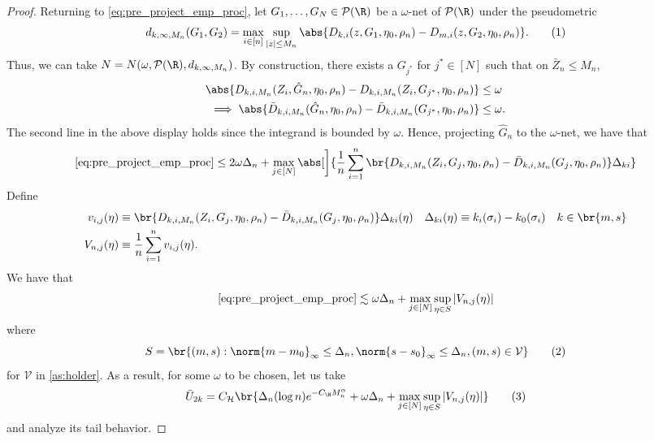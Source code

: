 \documentclass[12pt, reqno]{amsart}
\newcommand\numberthis{\addtocounter{equation}{1}\tag{\theequation}}
\newcommand{\Hyperparams}{\mathcal{H}}
\numberwithin{equation}{section}
\begin{document}
\begin{refsection}
\begin{appendices}
\begin{proof}
Returning to \eqref{eq:pre_project_emp_proc}, let $G_1,\ldots, G_N \in \mathcal P(\R)$ be
 a $\omega$-net of $\mathcal P(\R)$ under the pseudometric \[
d_{k, \infty, M_n}(G_1, G_2) = \max_{i\in [n]} \sup_{|z| \le M_n} \abs{D_{k,i}(z, G_1,
\eta_0, \rho_n) - D_{m,i}(z, G_2, \eta_0, \rho_n)}.
\numberthis \label{eq:def_dk}
 \]
Thus, we can take $N = N(\omega, \mathcal P(\R), d_{k, \infty, M_n})$. By construction,
there exists a $G_{j^*}$ for $j^* \in [N]$ such that on $\bar Z_n \le M_n$,\begin{align*}
\abs{D_{k,i, M_n}(Z_i, \hat G_n, \eta_0, \rho_n) - D_{k,i, M_n}(Z_i, G_{j^*}, \eta_0, \rho_n)} &\le
\omega \\ 
\implies \abs{\bar D_{k,i, M_n}(\hat G_n, \eta_0, \rho_n) - \bar D_{k,i, M_n}(G_{j^*},
\eta_0,
\rho_n)} &\le \omega.
\end{align*}
The second line in the above display holds since the integrand is bounded by $\omega$.
Hence, projecting $\hat
G_n$ to the $\omega$-net, we have that \[
\eqref{eq:pre_project_emp_proc} \le 2\omega \Delta_n + \max_{j \in [N]}
\abs[\bigg]{\frac{1}{n} \sum_{i=1}^n \br{D_
{k,i,
M_n}(Z_i, G_j, \eta_0, \rho_n) - \bar D_{k,i, M_n }(G_j, \eta_0, \rho_n)}
\Delta_{ki}}
\]
Define \begin{align*}
v_{i,j}(\eta) &\equiv \br{D_
{k,i,
M_n}(Z_i, G_j, \eta_0, \rho_n) - \bar D_{k,i, M_n }(G_j, \eta_0, \rho_n)}
\Delta_{ki}(\eta) \quad \Delta_{ki}(\eta) \equiv k_i(\sigma_i) - k_0(\sigma_i) \quad k\in
\br{m,s} \\
V_{n,j}(\eta) &\equiv \frac{1}{n} \sum_{i=1}^n v_{i,j}(\eta).
\end{align*}
We have that \[
\eqref{eq:pre_project_emp_proc} \lesssim \omega \Delta_n + \max_{j\in[N]} \sup_{\eta\in S}
|V_{n,j}(\eta)|
\]
where  \[S = \br{(m, s) : \norm{m-m_0}_\infty \le \Delta_n,
\norm{s-s_0}_\infty
\le \Delta_n, (m, s) \in \mathcal V}\numberthis \label{eq:S_def}\] for $\mathcal V$ in
\cref{as:holder}.
As a result, for some $\omega$ to be chosen, let us take \[
\bar U_{2k} = C_\Hyperparams \br{
  \Delta_n (\log n) e^{-C_\H M_n^\alpha} + \omega \Delta_n + \max_{j\in[N]} \sup_{\eta\in S}
|V_{n,j}(\eta)|
} \numberthis \label{eq:baru2k}
\]
and analyze its tail behavior. 



\end{proof}
\end{appendices}
\end{refsection}
\end{document}
